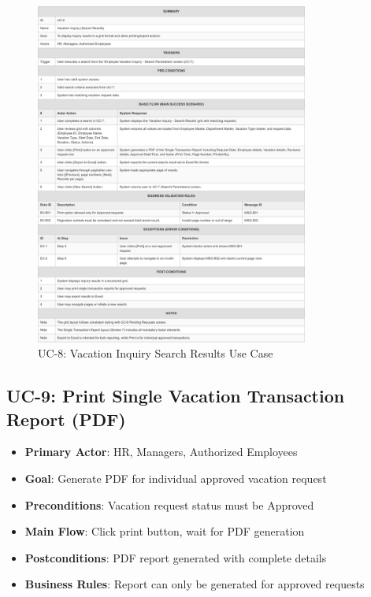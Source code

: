\documentclass[12pt,a4paper]{article}
\begin{document}
\begin{figure}[H]
\centering
\includegraphics[width=0.8\textwidth]{Use-Cases/UC-8-Vacation-Inquiry-Search-Results/UC-8-Vacation-Inquiry-Search-Results-1.png}
\caption{UC-8: Vacation Inquiry Search Results Use Case}
\label{fig:uc8}
\end{figure}

\subsection{UC-9: Print Single Vacation Transaction Report (PDF)}
\begin{itemize}
    \item \textbf{Primary Actor}: HR, Managers, Authorized Employees
    \item \textbf{Goal}: Generate PDF for individual approved vacation request
    \item \textbf{Preconditions}: Vacation request status must be Approved
    \item \textbf{Main Flow}: Click print button, wait for PDF generation
    \item \textbf{Postconditions}: PDF report generated with complete details
    \item \textbf{Business Rules}: Report can only be generated for approved requests
\end{itemize}
\end{document}
